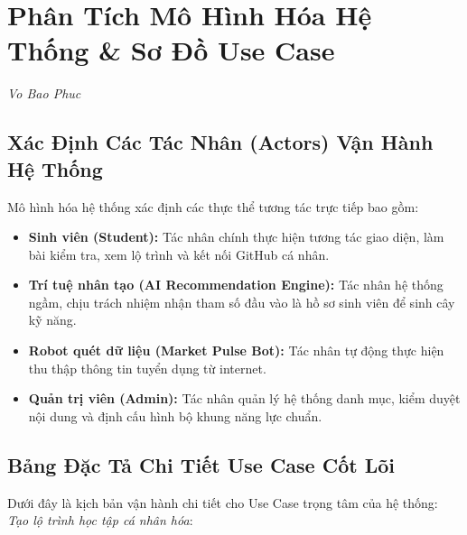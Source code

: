 \chapter{Phân Tích Mô Hình Hóa Hệ Thống \& Sơ Đồ Use Case}
\label{ch:use_case_modeling}
\textit{Vo Bao Phuc}

\section{Xác Định Các Tác Nhân (Actors) Vận Hành Hệ Thống}
Mô hình hóa hệ thống xác định các thực thể tương tác trực tiếp bao gồm:
\begin{itemize}
	\item \textbf{Sinh viên (Student):} Tác nhân chính thực hiện tương tác giao diện, làm bài kiểm tra, xem lộ trình và kết nối GitHub cá nhân.
	\item \textbf{Trí tuệ nhân tạo (AI Recommendation Engine):} Tác nhân hệ thống ngầm, chịu trách nhiệm nhận tham số đầu vào là hồ sơ sinh viên để sinh cây kỹ năng.
	\item \textbf{Robot quét dữ liệu (Market Pulse Bot):} Tác nhân tự động thực hiện thu thập thông tin tuyển dụng từ internet.
	\item \textbf{Quản trị viên (Admin):} Tác nhân quản lý hệ thống danh mục, kiểm duyệt nội dung và định cấu hình bộ khung năng lực chuẩn.
\end{itemize}

\section{Bảng Đặc Tả Chi Tiết Use Case Cốt Lõi}
Dưới đây là kịch bản vận hành chi tiết cho Use Case trọng tâm của hệ thống: \textit{Tạo lộ trình học tập cá nhân hóa}:

